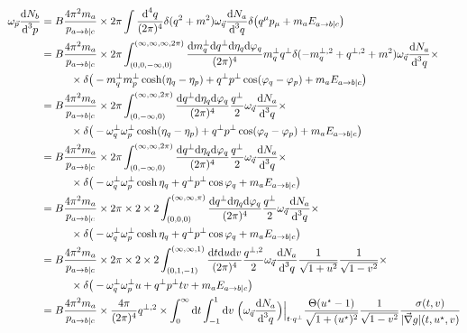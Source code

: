 \begin{subequations}
    \begin{align}
        \omega_{\vec{p}}\frac{\text{d} N_b}{\text{d}^3p}&=B\frac{4\pi^2m_a}{p_{a\rightarrow b\vert c}}\times2\pi\int\frac{\text{d}^4q}{(2\pi)^4}\delta(q^2+m^2)\omega_{\vec{q}}\frac{\text{d} N_a}{\text{d}^3 q}\delta\big(q^\mu p_\mu+m_a E_{a\rightarrow b\vert c}\big)\\
        &=B\frac{4\pi^2m_a}{p_{a\rightarrow b\vert c}}\times2\pi\int_{(0,0,-\infty,0)}^{(\infty,\infty,\infty,2\pi)}\frac{\text{d} m_q^\perp \text{d} q^\perp\text{d}\eta_q\text{d}\varphi_q}{(2\pi)^4}m_q^\perp q^\perp\delta(-m_q^{\perp,2}+q^{\perp,2}+m^2)\omega_{\vec{q}}\frac{\text{d} N_a}{\text{d}^3 q}\times\nonumber\\
        &\phantom{=}\qquad\times\delta\big(-m_q^\perp m_p^\perp\cosh(\eta_q-\eta_p)+q^\perp p^\perp\cos(\varphi_q-\varphi_p)+m_a E_{a\rightarrow b\vert c}\big)\\
        &=B\frac{4\pi^2m_a}{p_{a\rightarrow b\vert c}}\times2\pi\int_{(0,-\infty,0)}^{(\infty,\infty,2\pi)}\frac{\text{d} q^\perp\text{d}\eta_q\text{d}\varphi_q}{(2\pi)^4}\frac{q^\perp}{2}\omega_{\vec{q}}\frac{\text{d} N_a}{\text{d}^3 q}\times\nonumber\\
        &\phantom{=}\qquad\times\delta\big(-\omega_q^\perp \omega_p^\perp\cosh(\eta_q-\eta_p)+q^\perp p^\perp\cos(\varphi_q-\varphi_p)+m_a E_{a\rightarrow b\vert c}\big)\\
        &=B\frac{4\pi^2m_a}{p_{a\rightarrow b\vert c}}\times2\pi\int_{(0,-\infty,0)}^{(\infty,\infty,2\pi)}\frac{\text{d} q^\perp\text{d}\eta_q\text{d}\varphi_q}{(2\pi)^4}\frac{q^\perp}{2}\omega_{\vec{q}}\frac{\text{d} N_a}{\text{d}^3 q}\times\nonumber\\
        &\phantom{=}\qquad\times\delta\big(-\omega_q^\perp \omega_p^\perp\cosh\eta_q+q^\perp p^\perp\cos\varphi_q+m_a E_{a\rightarrow b\vert c}\big)\\
        &=B\frac{4\pi^2m_a}{p_{a\rightarrow b\vert c}}\times2\pi\times 2\times 2\int_{(0,0,0)}^{(\infty,\infty,\pi)}\frac{\text{d} q^\perp\text{d}\eta_q\text{d}\varphi_q}{(2\pi)^4}\frac{q^\perp}{2}\omega_{\vec{q}}\frac{\text{d} N_a}{\text{d}^3 q}\times\nonumber\\
        &\phantom{=}\qquad\times\delta\big(-\omega_q^\perp \omega_p^\perp\cosh\eta_q+q^\perp p^\perp\cos\varphi_q+m_a E_{a\rightarrow b\vert c}\big)\\
        &=B\frac{4\pi^2m_a}{p_{a\rightarrow b\vert c}}\times2\pi\times 2\times 2\int_{(0,1,-1)}^{(\infty,\infty,1)}\frac{\text{d} t\text{d} u\text{d} v}{(2\pi)^4}\frac{q^{\perp,2}}{2}\omega_{\vec{q}}\frac{\text{d} N_a}{\text{d}^3 q}\frac{1}{\sqrt{1+u^2}}\frac{1}{\sqrt{1-v^2}}\times\nonumber\\
        &\phantom{=}\qquad\times\delta\big(-\omega_q^\perp \omega_p^\perp u+q^\perp p^\perp tv+m_a E_{a\rightarrow b\vert c}\big)\\
        &=B\frac{4\pi^2m_a}{p_{a\rightarrow b\vert c}}\times\frac{4\pi}{(2\pi)^4}q^{\perp,2}\times\int_0^\infty\text{d} t\int_{-1}^1\text{d} v\;\Big(\omega_{\vec{q}}\frac{\text{d} N_a}{\text{d}^3 q}\Big)\Big\vert_{t\cdot q^\perp}\frac{\Theta(u^\star-1)}{\sqrt{1+(u^\star)^2}}\frac{1}{\sqrt{1-v^2}}\frac{\sigma(t,v)}{\vert\vec{\nabla}g\vert(t,u^\star,v)}
    \end{align}
\end{subequations}
